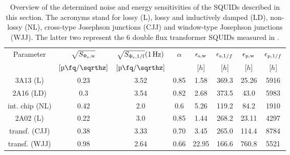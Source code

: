 \begin{table}[t!]
	\centering
	\begin{tabular}{c|*{7}{c}}
	\toprule
		Parameter & $\sqrt{S_{\rm \Phi_{\rm s},w}}$ & $\sqrt{S_{\rm \Phi_{\rm s},1/f}}(\qty{1}{\Hz})$ & $\alpha$ & $\epsilon_{\rm s,w}$ & $\epsilon_{{\rm s},1/f}$ & $\epsilon_{\rm p,w}$ & $\epsilon_{{\rm p},1/f}$ \\
		 & $[\unit[per-mode=symbol]{\micro\fq\per\sqrthz}]$ & $[\unit[per-mode=symbol]{\micro\fq\per\sqrthz}]$ &  & [$h$] & [$h$] & [$h$] & [$h$] \\
		\midrule
		3A13 (L) & 0.23 & 3.52 & 0.85 & 1.58 & 369.3 & 25.26 & 5916 \\
		2A16 (LD) & 0.3 & 3.54 & 0.82 & 2.68 & 373.5 & 43.0 & 5983 \\
		int. chip (NL) & 0.42 & 2.0 & 0.6 & 5.26 & 119.2 & 84.2 & 1910 \\
		2A02 (L) & 0.22 & 3.0 & 0.85 & 1.44 & 268.2 & 23.11 & 4297 \\
		transf. (CJJ) & 0.38 & 3.33 & 0.70 & 3.45 & 265.0 & 114.4 & 8784 \\
		transf. (WJJ) & 0.98 & 2.64 & 0.66 & 22.95 & 166.6 & 760.8 & 5521 \\
	\end{tabular}
	\caption{Overview of the determined noise and energy sensitivities of the SQUIDs described in this section. The acronyms stand for lossy (L), lossy and inductively damped (LD), non-lossy (NL), cross-type Josephson junctions (CJJ) and window-type Josephson junctions (WJJ). The latter two represent the \qty{6}{\nH} double flux transformer SQUIDs measured in \cite{Bauer2022}.}
	\label{tab:noise}
\end{table}










